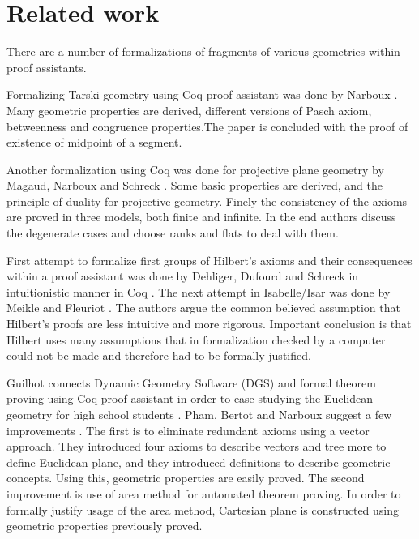 \section{Related work}
\label{sec:related}

There are a number of formalizations of fragments of various
geometries within proof assistants.

Formalizing Tarski geometry using Coq proof assistant was done by
Narboux \cite{narboux}.  Many geometric properties are derived,
different versions of Pasch axiom, betweenness and congruence
properties.The paper is concluded with the proof of existence of
midpoint of a segment.

Another formalization using Coq was done for projective plane geometry
by Magaud, Narboux and Schreck \cite{projective-coq1,projective-coq2}.
Some basic properties are derived, and the principle of duality
for projective geometry.  Finely the consistency of the axioms are
proved in three models, both finite and infinite. In the end authors
discuss the degenerate cases and choose ranks and flats to deal with
them.

First attempt to formalize first groups of Hilbert's axioms and their
consequences within a proof assistant was done by Dehliger, Dufourd
and Schreck in intuitionistic manner in Coq \cite{hilbert-coq}. The
next attempt in Isabelle/Isar was done by Meikle and Fleuriot
\cite{hilbert-isabelle}. The authors argue the common believed
assumption that Hilbert's proofs are less intuitive and more
rigorous. Important conclusion is that Hilbert uses many assumptions
that in formalization checked by a computer could not be made and
therefore had to be formally justified.

Guilhot connects Dynamic Geometry Software (DGS) and formal theorem
proving using Coq proof assistant in order to ease studying the
Euclidean geometry for high school students \cite{guilhot}. Pham,
Bertot and Narboux suggest a few improvements \cite{coqly}. The first
is to eliminate redundant axioms using a vector approach. They
introduced four axioms to describe vectors and tree more to define
Euclidean plane, and they introduced definitions to describe geometric
concepts. Using this, geometric properties are easily proved. The
second improvement is use of area method for automated theorem
proving. In order to formally justify usage of the area method,
Cartesian plane is constructed using geometric properties previously
proved.

